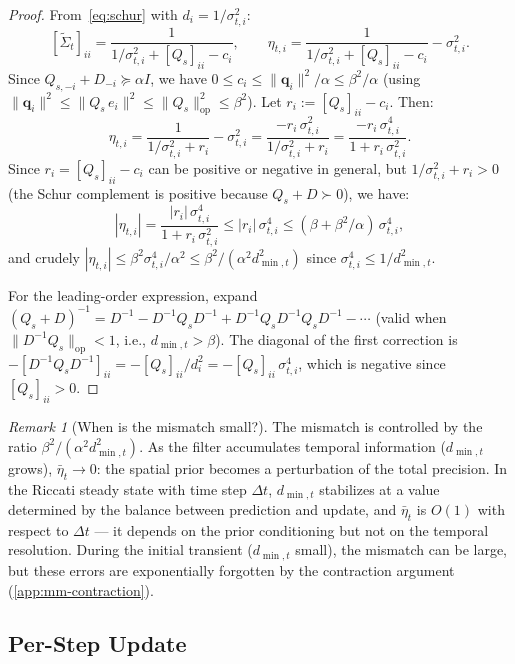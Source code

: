 \documentclass{article}
\theoremstyle{plain}
\theoremstyle{definition}
\theoremstyle{remark}
\newtheorem{remark}[theorem]{Remark}
\newcommand{\norm}[1]{\lVert #1 \rVert}
\newcommand{\opnorm}[1]{\lVert #1 \rVert_{\mathrm{op}}}
\begin{document}
\begin{proof}
From~\eqref{eq:schur} with $d_i = 1/\sigma_{t,i}^2$:
\[
[\widetilde{\Sigma}_t]_{ii} = \frac{1}{1/\sigma_{t,i}^2 + [Q_s]_{ii} - c_i}, \qquad
\eta_{t,i} = \frac{1}{1/\sigma_{t,i}^2 + [Q_s]_{ii} - c_i} - \sigma_{t,i}^2.
\]
Since $Q_{s,-i} + D_{-i} \succeq \alpha I$, we have $0 \leq c_i \leq \norm{\mathbf{q}_i}^2/\alpha \leq \beta^2/\alpha$ (using $\norm{\mathbf{q}_i}^2 \leq \norm{Q_s\, e_i}^2 \leq \opnorm{Q_s}^2 \leq \beta^2$). Let $r_i := [Q_s]_{ii} - c_i$. Then:
\[
\eta_{t,i} = \frac{1}{1/\sigma_{t,i}^2 + r_i} - \sigma_{t,i}^2 = \frac{-r_i\,\sigma_{t,i}^2}{1/\sigma_{t,i}^2 + r_i} = \frac{-r_i\,\sigma_{t,i}^4}{1 + r_i\,\sigma_{t,i}^2}.
\]
Since $r_i = [Q_s]_{ii} - c_i$ can be positive or negative in general, but $1/\sigma_{t,i}^2 + r_i > 0$ (the Schur complement is positive because $Q_s + D \succ 0$), we have:
\[
|\eta_{t,i}| = \frac{|r_i|\,\sigma_{t,i}^4}{1 + r_i\,\sigma_{t,i}^2} \leq |r_i|\,\sigma_{t,i}^4 \leq (\beta + \beta^2/\alpha)\,\sigma_{t,i}^4,
\]
and crudely $|\eta_{t,i}| \leq \beta^2\sigma_{t,i}^4/\alpha^2 \leq \beta^2/(\alpha^2 d_{\min,t}^2)$ since $\sigma_{t,i}^4 \leq 1/d_{\min,t}^2$.

For the leading-order expression, expand $(Q_s + D)^{-1} = D^{-1} - D^{-1}Q_s D^{-1} + D^{-1}Q_s D^{-1}Q_s D^{-1} - \cdots$ (valid when $\opnorm{D^{-1}Q_s} < 1$, i.e., $d_{\min,t} > \beta$). The diagonal of the first correction is $-[D^{-1}Q_s D^{-1}]_{ii} = -[Q_s]_{ii}/d_i^2 = -[Q_s]_{ii}\,\sigma_{t,i}^4$, which is negative since $[Q_s]_{ii} > 0$.
\end{proof}

\begin{remark}[When is the mismatch small?]
The mismatch is controlled by the ratio $\beta^2/(\alpha^2 d_{\min,t}^2)$. As the filter accumulates temporal information ($d_{\min,t}$ grows), $\bar{\eta}_t \to 0$: the spatial prior becomes a perturbation of the total precision. In the Riccati steady state with time step $\Delta t$, $d_{\min,t}$ stabilizes at a value determined by the balance between prediction and update, and $\bar{\eta}_t$ is $O(1)$ with respect to $\Delta t$ --- it depends on the prior conditioning but not on the temporal resolution. During the initial transient ($d_{\min,t}$ small), the mismatch can be large, but these errors are exponentially forgotten by the contraction argument (\cref{app:mm-contraction}).
\end{remark}

\subsection{Per-Step Update}
\label{app:mm-perstep-update}
\end{document}
